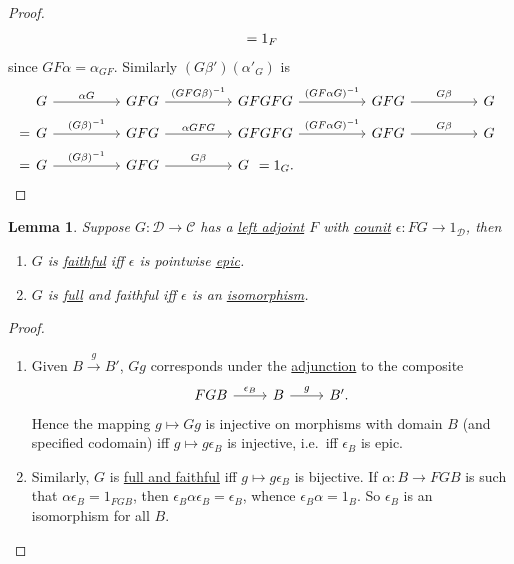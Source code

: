 \documentclass{article}
\let\to\longrightarrow
\let\mapsto\longmapsto
\newtheorem{nlemma}[nthm]{Lemma}
\begin{document}
\begin{proof}
\begin{align*}
\begin{tikzcd}[ampersand replacement=\&, column sep=huge]
    \end{tikzcd}
    = 1_F
  \end{align*}
  since $GF\alpha = \alpha_{GF}$.
  Similarly $(G\beta')(\alpha'_G)$ is
  \begin{align*}
    &\begin{tikzcd}[ampersand replacement=\&, column sep=huge]
    G \rar{\alpha G} \& GFG \rar{(GFG\beta)^{-1}} \& GFGFG \rar{(GF\alpha G)^{-1}} \& GFG \rar{G\beta} \& G
    \end{tikzcd} \\
    =
    &\begin{tikzcd}[ampersand replacement=\&, column sep=huge]
      G \rar{(G\beta)^{-1}} \& GFG \rar{\alpha GFG} \& GFGFG \rar{(GF\alpha G)^{-1}} \& GFG \rar{G\beta} \& G
    \end{tikzcd} \\
    =
    &\begin{tikzcd}[ampersand replacement=\&, column sep=huge]
    G \rar{(G\beta)^{-1}} \& GFG \rar{G\beta} \& G
    \end{tikzcd}
    = 1_G. \qedhere
  \end{align*}
\end{proof}
\begin{nlemma}\label{lem:3.9}
  Suppose $G: \mathscr{D} \to \mathscr{C}$ has a \hyperlink{def:adj}{left adjoint} $F$ with \hyperlink{def:counit}{counit} $\epsilon: FG \to 1_{\mathscr{D}}$, then
  \begin{enumerate}[label=(\roman*)]
    \item $G$ is \hyperlink{def:full}{faithful} iff $\epsilon$ is pointwise \hyperlink{def:epic}{epic}.
    \item $G$ is \hyperlink{def:full}{full} and faithful iff $\epsilon$ is an \hyperlink{def:natiso}{isomorphism}.
  \end{enumerate}
\end{nlemma}
\begin{proof}\leavevmode
  \begin{enumerate}[label=(\roman*)]
    \item Given $B \overset{g}\to B'$, $Gg$ corresponds under the \hyperlink{def:adj}{adjunction} to the composite
      \begin{equation*}
        \begin{tikzcd}
          FGB \rar{\epsilon_B} & B \rar{g} & B'.
        \end{tikzcd}
      \end{equation*}
      Hence the mapping $g \mapsto Gg$ is injective on morphisms with domain $B$ (and specified codomain) iff $g \mapsto g \epsilon_B$ is injective, i.e.\ iff $\epsilon_B$ is epic.
    \item Similarly, $G$ is \hyperlink{def:full}{full and faithful} iff $g \mapsto g \epsilon_B$ is bijective.
      If $\alpha: B \to FGB$ is such that $\alpha \epsilon_B = 1_{FGB}$, then $\epsilon_B \alpha \epsilon_B = \epsilon_B$, whence $\epsilon_B \alpha = 1_B$.
      So $\epsilon_B$ is an isomorphism for all $B$. \qedhere
  \end{enumerate}
\end{proof}
\end{document}
